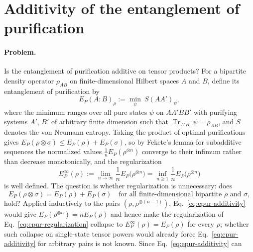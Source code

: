 \section{Additivity of the entanglement of purification}
\label{sec:op_ac5fa4581b04f4c2}

\paragraph{Problem.}
Is the entanglement of purification additive on tensor products?  For a
bipartite density operator $\rho_{AB}$ on finite-dimensional Hilbert spaces
$A$ and $B$, define its entanglement of purification by
\begin{equation}
  E_P(A{:}B)_\rho
  :=\min_{\psi}\ S(AA')_\psi,
  \label{eq:epur-definition}
\end{equation}
where the minimum ranges over all pure states $\psi$ on $AA'BB'$ with
purifying systems $A'$, $B'$ of arbitrary finite dimension such that
$\operatorname{Tr}_{A'B'}\psi=\rho_{AB}$, and $S$ denotes the von Neumann
entropy.  Taking the product of optimal purifications gives
$E_P(\rho\otimes\sigma)\leq E_P(\rho)+E_P(\sigma)$, so by Fekete's lemma for
subadditive sequences the normalized values $\frac1nE_P(\rho^{\otimes n})$
converge to their infimum rather than decrease monotonically, and the
regularization
\begin{equation}
  E_P^\infty(\rho)
  :=\lim_{n\to\infty}\frac1nE_P\bigl(\rho^{\otimes n}\bigr)
  =\inf_{n\geq1}\frac1nE_P\bigl(\rho^{\otimes n}\bigr)
  \label{eq:epur-regularization}
\end{equation}
is well defined.  The question is whether regularization is unnecessary:
does
\begin{equation}
  E_P(\rho\otimes\sigma)=E_P(\rho)+E_P(\sigma)
  \quad\text{for all finite-dimensional bipartite }\rho\text{ and }\sigma,
  \label{eq:epur-additivity}
\end{equation}
hold?  Applied inductively to the pairs $(\rho,\rho^{\otimes(n-1)})$,
Eq.~\eqref{eq:epur-additivity} would give $E_P(\rho^{\otimes n})=nE_P(\rho)$
and hence make the regularization of Eq.~\eqref{eq:epur-regularization}
collapse to $E_P^\infty(\rho)=E_P(\rho)$ for every $\rho$; whether such collapse on
single-state tensor powers would already force Eq.~\eqref{eq:epur-additivity}
for arbitrary pairs is not known.  Since Eq.~\eqref{eq:epur-additivity} can
